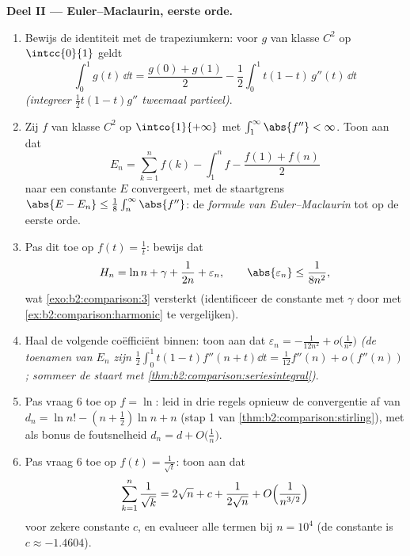 \begin{problem}
\medskip
\noindent\textbf{Deel II --- Euler--Maclaurin, eerste orde.}
\begin{enumerate}[resume]
  \item Bewijs de identiteit met de trapeziumkern: voor $g$ van
        klasse $C^2$ op $\intcc{0}{1}$ geldt
        \[
        \int_0^1 g(t)\,\dd t = \frac{g(0) + g(1)}{2}
        - \frac12\int_0^1 t(1 - t)\,g''(t)\,\dd t
        \]
        \emph{(integreer $\frac12 t(1-t)g''$ tweemaal partieel)}.
  \item Zij $f$ van klasse $C^2$ op $\intco{1}{+\infty}$ met
        $\int_1^\infty \abs{f''} < \infty$. Toon aan dat
        \[
        E_n = \sum_{k=1}^{n} f(k) - \int_1^n f -
        \frac{f(1) + f(n)}{2}
        \]
        naar een constante $E$ convergeert, met de staartgrens
        $\abs{E - E_n} \leq \frac18\int_n^\infty\abs{f''}$: de
        \emph{formule van Euler--Maclaurin} tot op de eerste
        orde.
  \item Pas dit toe op $f(t) = \frac1t$: bewijs dat
        \[
        H_n = \ln n + \gamma + \frac{1}{2n} + \varepsilon_n,
        \qquad \abs{\varepsilon_n} \leq \frac{1}{8n^2},
        \]
        wat \cref{exo:b2:comparison:3} versterkt (identificeer de
        constante met $\gamma$ door met
        \cref{ex:b2:comparison:harmonic} te vergelijken).
  \item Haal de volgende coëfficiënt binnen: toon aan dat
        $\varepsilon_n = -\frac{1}{12n^2} +
        o\bigl(\frac1{n^2}\bigr)$ \emph{(de toenamen van $E_n$
        zijn $\frac12\int_0^1t(1-t)f''(n+t)\dd t =
        \frac1{12}f''(n) + o(f''(n))$; sommeer de staart met
        \cref{thm:b2:comparison:seriesintegral})}.
  \item Pas vraag 6 toe op $f = \ln$: leid in drie regels opnieuw
        de convergentie af van $d_n = \ln n! - (n + \frac12)\ln n
        + n$ (stap 1 van \cref{thm:b2:comparison:stirling}), met
        als bonus de foutsnelheid $d_n = d +
        O\bigl(\frac1n\bigr)$.
  \item Pas vraag 6 toe op $f(t) = \frac{1}{\sqrt t}$: toon aan
        dat
        \[
        \sum_{k=1}^{n}\frac1{\sqrt k} = 2\sqrt n + c +
        \frac{1}{2\sqrt n} + O\Bigl(\frac{1}{n^{3/2}}\Bigr)
        \]
        voor zekere constante $c$, en evalueer alle termen bij $n
        = 10^4$ (de constante is $c \approx -1.4604$).
\end{enumerate}


\end{problem}
